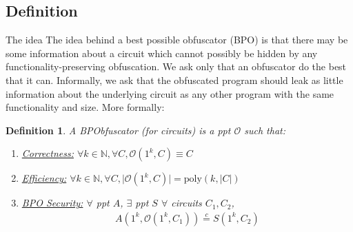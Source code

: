 \documentclass{article}
\newtheorem{definition}[corollary]{Definition}
\newcommand{\ci}{\stackrel{c}{=}}
\begin{document}
\subsection{Definition}
The idea The idea behind a best possible obfuscator (BPO) is that there may be some information about a circuit which cannot possibly be hidden by any functionality-preserving obfuscation. We ask only that an obfuscator do the best that it can. Informally, we ask that the obfuscated program should leak as little information about the underlying circuit as any other program with the same functionality and size. More formally:
\begin{definition}
    A BPObfuscator (for circuits) is a ppt $\mathcal{O}$ such that:
    \begin{enumerate}
        \item \underline{Correctness:} $\forall{k}\in\mathbb{N}, \forall{C}, \mathcal{O}(1^k, C) \equiv C$
        \item \underline{Efficiency:} $\forall{k}\in\mathbb{N}, \forall{C}, \lvert \mathcal{O}(1^k, C) \rvert = \text{poly}(k, \lvert C \rvert)$
        \item \underline{BPO Security:} $\forall$ ppt $A$, $\exists$ ppt $S$ $\forall$ circuits $C_1, C_2$,
        \begin{align*}
            A(1^k, \mathcal{O}(1^k, C_1)) \ci S(1^k, C_2)
        \end{align*}
    \end{enumerate}
\end{definition}
\end{document}
